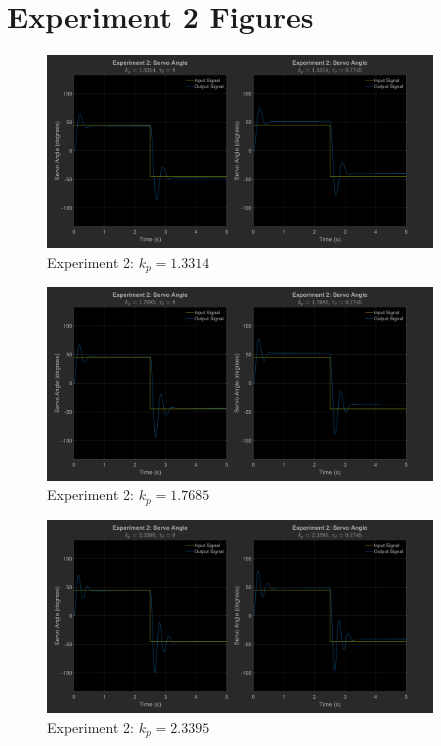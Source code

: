 \documentclass[12pt]{article}
\begin{document}
\section{Experiment 2 Figures} \label{appendix:exp2fig}
\begin{figure}[h]
    \centering
    \includegraphics[width=0.91\textwidth]{exp2_kp1.3314}
    \caption{\label{fig:exp2_kp1.3314}Experiment 2: $k_p = 1.3314$}
\end{figure}
\begin{figure}[h]
    \centering
    \includegraphics[width=0.91\textwidth]{exp2_kp1.7685}
    \caption{\label{fig:exp2_kp1.7685}Experiment 2: $k_p = 1.7685$}
\end{figure}
\begin{figure}[h]
    \centering
    \includegraphics[width=0.91\textwidth]{exp2_kp2.3395}
    \caption{Experiment 2: $k_p = 2.3395$}
\end{figure}
\end{document}
